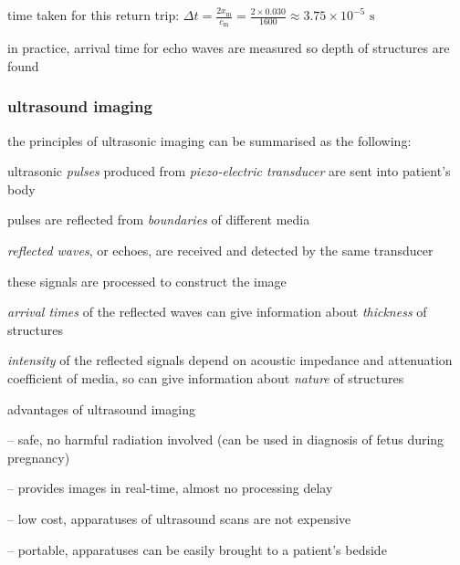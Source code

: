 time taken for this return trip: $\Delta t = \frac{2x_\text{m}}{c_\text{m}} = \frac{2\times0.030}{1600} \approx 3.75\times10^{-5} \text{ s}$ 

in practice, arrival time for echo waves are measured so depth of structures are found \eoe






\subsubsection{ultrasound imaging}

the principles of ultrasonic imaging can be summarised as the following:

ultrasonic \emph{pulses} produced from \emph{piezo-electric transducer} are sent into patient’s body

pulses are reflected from \emph{boundaries} of different media

\emph{reflected waves}, or echoes, are received and detected by the same transducer

these signals are processed to construct the image

\emph{arrival times} of the reflected waves can give information about \emph{thickness} of structures

\emph{intensity} of the reflected signals depend on acoustic impedance and attenuation coefficient of media, so can give information about \emph{nature} of structures


\cmt advantages of ultrasound imaging

\begin{compactitem}
	\item[--] safe, no harmful radiation involved (can be used in diagnosis of fetus during pregnancy)
	
	\item[--] provides images in real-time, almost no processing delay
	
	\item[--] low cost, apparatuses of ultrasound scans are not expensive
	
	\item[--] portable, apparatuses can be easily brought to a patient's bedside
\end{compactitem}
	
